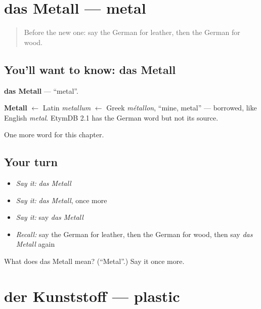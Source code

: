 \section[das Metall]{das Metall — metal}

\label{lesson:GE-C204-metall}



\begin{quote}
Before the new one: say the German for leather, then the German for wood.
\end{quote}

\subsection*{You'll want to know: das Metall}
\textbf{das Metall} — \textquotedblleft{}metal\textquotedblright{}.

\begin{cousinweb}
\textbf{Metall} $\leftarrow$ Latin \emph{metallum} $\leftarrow$ Greek \emph{métallon}, \textquotedblleft{}mine, metal\textquotedblright{} — borrowed, like English \emph{metal}. EtymDB 2.1 has the German word but not its source.
\end{cousinweb}

\begin{grammarlens}[title={What you've built}]
One more word for this chapter.
\end{grammarlens}

\subsection*{Your turn}
\begin{itemize}
\raggedright
  \item \emph{Say it:} \emph{das Metall}
  \item \emph{Say it:} \emph{das Metall}, once more
  \item \emph{Say it:} say \emph{das Metall}
  \item \emph{Recall:} say the German for leather, then the German for wood, then say \emph{das Metall} again
\end{itemize}

\begin{tcolorbox}[breakable,colback=teal!4,colframe=teal!35!black,title={Before you move on}]
What does das Metall mean? (\textquotedblleft{}Metal\textquotedblright{}.) Say it once more.
\end{tcolorbox}
\section[der Kunststoff]{der Kunststoff — plastic}

